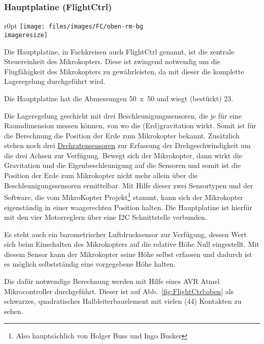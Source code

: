 \subsubsection{Hauptplatine (FlightCtrl)}
\begin{wrapfigure}{r}{0pt}
	\texttt{[image: files/images/FC/oben-rm-bg\\imageresize]}
	\label{fig:FlightCtrl:oben}
\end{wrapfigure}

Die Hauptplatine, in Fachkreisen auch FlightCtrl genannt,
ist die zentrale Steuereinheit des Mikrokopters.
Diese ist zwingend notwendig um die Flugfähigkeit des Mikrokopters zu gewährleisten,
da mit dieser die komplette Lageregelung durchgeführt wird.

Die Hauptplatine hat die Abmessungen \unit{50 x 50}{\milli\metre}
und wiegt (bestückt) \unit{23}{\gram}.

Die Lageregelung geschieht mit drei Beschleunigungssensoren,
die je für eine Raumdimension messen können,
von wo die (Erd)gravitation wirkt.
Somit ist für die Berechnung die Position der Erde zum Mikrokopter bekannt.
Zusätzlich stehen noch drei
\href{http://de.wikipedia.org/wiki/Drehratensensor}{Drehratensensoren}
zur Erfassung der Drehgeschwindigkeit um die drei Achsen zur Verfügung.
Bewegt sich der Mikrokopter, dann wirkt die Gravitation
und die Eigenbeschleunigung auf die Sensoren
und somit ist die Position der Erde zum Mikrokopter nicht mehr allein
über die Beschleunigungssensoren ermittelbar.
Mit Hilfe dieser zwei Sensortypen und der Software, die vom
MikroKopter Projekt\footnote{Also hauptsächlich von Holger Buss und Ingo Busker} stammt,
kann sich der Mikrokopter eigenständig in einer waagerechten Position halten.
Die Hauptplatine ist hierfür mit den vier Motorreglern
über eine \ac{I2C} Schnittstelle verbunden.

Es steht auch ein barometrischer Luftdrucksensor zur Verfügung,
dessen Wert sich beim Einschalten des Mikrokopters auf die relative Höhe Null eingestellt.
Mit diesem Sensor kann der Mikrokopter seine Höhe selbst erfassen
und dadurch ist es möglich selbstständig eine vorgegebene Höhe halten.

Die dafür notwendige Berechnung werden mit Hilfe eines AVR Atmel Mikrocontroller durchgeführt.
Dieser ist auf Abb.~\vref{fig:FlightCtrl:oben} als schwarzes, quadratisches Halbleiterbauelement
mit vielen (44) Kontakten zu sehen.

